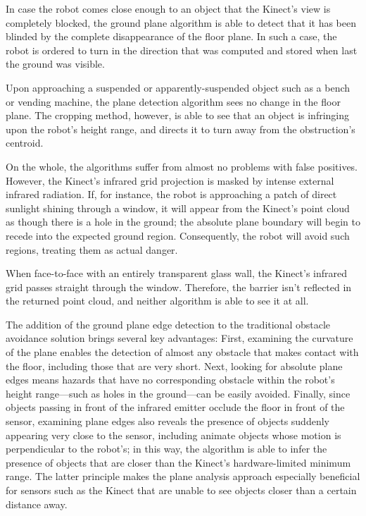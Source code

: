 \documentclass[12pt]{report}
\begin{document}
In case the robot comes close enough to an object that the Kinect's view is completely blocked, the ground plane algorithm is able to detect that it has been blinded by the complete disappearance of the floor plane.  In such a case, the robot is ordered to turn in the direction that was computed and stored when last the ground was visible.

Upon approaching a suspended or apparently-suspended object such as a bench or vending machine, the plane detection algorithm sees no change in the floor plane.  The cropping method, however, is able to see that an object is infringing upon the robot's height range, and directs it to turn away from the obstruction's centroid.

On the whole, the algorithms suffer from almost no problems with false positives.  However, the Kinect's infrared grid projection is masked by intense external infrared radiation.  If, for instance, the robot is approaching a patch of direct sunlight shining through a window, it will appear from the Kinect's point cloud as though there is a hole in the ground; the absolute plane boundary will begin to recede into the expected ground region.  Consequently, the robot will avoid such regions, treating them as actual danger.

When face-to-face with an entirely transparent glass wall, the Kinect's infrared grid passes straight through the window.  Therefore, the barrier isn't reflected in the returned point cloud, and neither algorithm is able to see it at all.

The addition of the ground plane edge detection to the traditional obstacle avoidance solution brings several key advantages:  First, examining the curvature of the plane enables the detection of almost any obstacle that makes contact with the floor, including those that are very short.  Next, looking for absolute plane edges means hazards that have no corresponding obstacle within the robot's height range---such as holes in the ground---can be easily avoided.  Finally, since objects passing in front of the infrared emitter occlude the floor in front of the sensor, examining plane edges also reveals the presence of objects suddenly appearing very close to the sensor, including animate objects whose motion is perpendicular to the robot's; in this way, the algorithm is able to infer the presence of objects that are closer than the Kinect's hardware-limited minimum range.  The latter principle makes the plane analysis approach especially beneficial for sensors such as the Kinect that are unable to see objects closer than a certain distance away.
\end{document}
